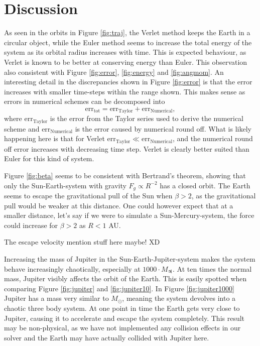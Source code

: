\documentclass[twocolumn]{aastex62}
\begin{document}
\section{Discussion} \label{sec:discussion}
As seen in the orbits in Figure \ref{fig:traj}, the Verlet method 
keeps the Earth in a circular object, while the Euler method seems to 
increase the total energy of the system as its orbital radius increases 
with time. This is expected behaviour, as Verlet is known to be better
at conserving energy than Euler. This observation also consistent with 
Figure \ref{fig:error}, \ref{fig:energy} and \ref{fig:angmom}. An 
interesting detail in the discrepancies shown in Figure \ref{fig:error}
is that the error increases with smaller time-steps within the range 
shown. This makes sense as errors in numerical schemes can be decomposed 
into \begin{equation}
\mathrm{err}_\mathrm{tot}=\mathrm{err}_\mathrm{Taylor} + \mathrm{err}_
\mathrm{Numerical}, \label{eq:error_decomp}
\end{equation} where $\mathrm{err}_\mathrm{Taylor}$ is the error from the 
Taylor series used to derive the numerical scheme and $\mathrm{err}_
\mathrm{Numerical}$ is the error caused by numerical round off. What is 
likely happening here is that for Verlet 
$\mathrm{err}_\mathrm{Taylor} \ll \mathrm{err}_\mathrm{Numerical}$, 
and the numerical round off error increases with decreasing time step. 
Verlet is clearly better suited than Euler for this kind of system.

Figure \ref{fig:beta} seems to be consistent with Bertrand's theorem, 
showing that only the Sun-Earth-system with gravity $F_g\propto R^{-2}$ 
has a closed orbit. The Earth seems to escape the gravitational pull of 
the Sun when $\beta>2$, as the gravitational pull would be weaker at 
this distance. One could however expect that at a smaller distance, let's 
say if we were to simulate a Sun-Mercury-system, the force could increase 
for $\beta>2$ as $R<1$ AU.

The escape velocity mention stuff here maybe! XD


Increasing the mass of Jupiter in the Sun-Earth-Jupiter-system makes the 
system behave increasingly chaotically, especially at 
$1000 \cdot M_\mathrm{\jupiter}$. At ten times the normal mass, 
Jupiter visibly affects the orbit of the Earth. This is easily spotted  
when comparing Figure \ref{fig:jupiter} and \ref{fig:jupiter10}. 
In Figure \ref{fig:jupiter1000} Jupiter 
has a mass very similar to $M_\odot$, meaning the system devolves 
into a chaotic three body system. At one point in time the Earth gets 
very close to Jupiter, causing it to accelerate and escape the system 
completely. This result may be non-physical, as we have not implemented 
any collision effects in our solver and the Earth may have actually 
collided with Jupiter here. 
\end{document}
